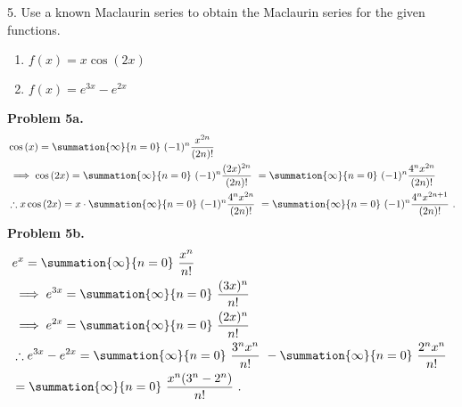 \documentclass{report}
\begin{document}
    \pagebreak 
    \begin{mdframed}
        5. Use a known Maclaurin series to obtain the Maclaurin series for the given functions.
        \begin{enumerate}[label=(\alph*)]
            \item $ f(x) = x\cos{(2x)} $
            \item $f(x) = e^{3x} -e^{2x} $
        \end{enumerate}
    \end{mdframed}
    \bigbreak \noindent 
    \textbf{Problem 5a.} 
    \begin{align*}
        &\cos{(x)} = \summation{\infty}{n=0}\ (-1)^{n}\frac{x^{2n}}{(2n)!}\  \\
        &\implies\cos{(2x)} = \summation{\infty}{n=0}\ (-1)^{n}\frac{(2x)^{2n}}{(2n)!}\  = \summation{\infty}{n=0}\ (-1)^{n}\frac{4^{n}x^{2n}}{(2n)!}\  \\
        &\therefore x\cos{(2x)} = x \cdot \summation{\infty}{n=0}\ (-1)^{n}\frac{4^{n}x^{2n}}{(2n)!}\ = \summation{\infty}{n=0}\ (-1)^{n}\frac{4^{n}x^{2n+1}}{(2n)!}\ 
    .\end{align*}
    \bigbreak \noindent 
    \textbf{Problem 5b.}
    \begin{align*}
        &e^{x} = \summation{\infty}{n=0}\ \frac{x^{n}}{n!}\  \\
        &\implies e^{3x} = \summation{\infty}{n=0}\ \frac{(3x)^{n}}{n!}\  \\
        &\implies e^{2x} = \summation{\infty}{n=0}\ \frac{(2x)^{n}}{n!}\  \\
        &\therefore e^{3x} - e^{2x} = \summation{\infty}{n=0}\ \frac{3^{n}x^{n}}{n!}\ - \summation{\infty}{n=0}\ \frac{2^{n}x^{n}}{n!}\   \\
        &=\summation{\infty}{n=0}\ \frac{x^{n}(3^{n}-2^{n})}{n!}\ 
    .\end{align*}







    
    
\end{document}
